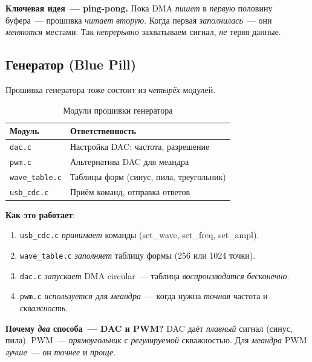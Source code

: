 \begin{keybox}
\textbf{Ключевая идея~--- ping-pong.} Пока DMA \emph{пишет}
в \emph{первую} половину буфера~--- прошивка \emph{читает}
\emph{вторую}. Когда первая \emph{заполнилась}~---
они \emph{меняются} местами. Так \emph{непрерывно} захватываем
сигнал, \emph{не} теряя данные.
\end{keybox}

\subsection{Генератор (Blue Pill)}

Прошивка генератора тоже состоит из \emph{четырёх} модулей.

\begin{table}[htbp]
\centering
\caption{Модули прошивки генератора}
\label{tab:arch-gen-modules}
\small
\begin{tabularx}{\textwidth}{@{}l L@{}}
\toprule
\textbf{Модуль} & \textbf{Ответственность} \\
\midrule
\texttt{dac.c}       & Настройка DAC: частота, разрешение \\
\texttt{pwm.c}       & Альтернатива DAC для меандра \\
\texttt{wave\_table.c} & Таблицы форм (синус, пила, треугольник) \\
\texttt{usb\_cdc.c}  & Приём команд, отправка ответов \\
\bottomrule
\end{tabularx}
\end{table}

\textbf{Как это работает}:

\begin{enumerate}
    \item \texttt{usb\_cdc.c} \emph{принимает} команды
          (set\_wave, set\_freq, set\_ampl).
    \item \texttt{wave\_table.c} \emph{заполняет} таблицу
          формы (256 или 1024 точки).
    \item \texttt{dac.c} \emph{запускает} DMA circular~---
          таблица \emph{воспроизводится} \emph{бесконечно}.
    \item \texttt{pwm.c} \emph{используется} для \emph{меандра}~---
          когда нужна \emph{точная} частота и \emph{скважность}.
\end{enumerate}

\begin{ideabox}
\textbf{Почему \emph{два} способа~--- DAC и PWM?} DAC даёт
\emph{плавный} сигнал (синус, пила). PWM~--- \emph{прямоугольник}
с \emph{регулируемой} скважностью. Для \emph{меандра} PWM
\emph{лучше}~--- он \emph{точнее} и \emph{проще}.
\end{ideabox}

